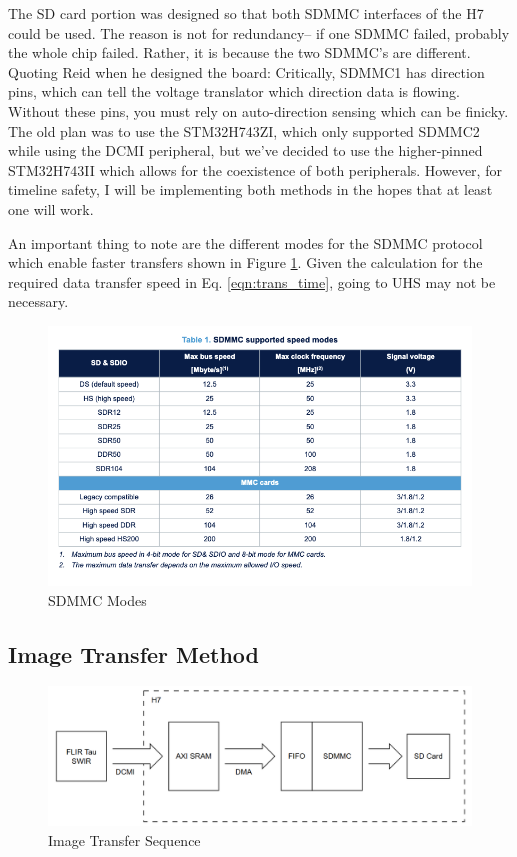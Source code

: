 \documentclass[12pt,a4paper]{article}
\begin{document}
    The SD card portion was designed so that both SDMMC interfaces of the H7 could 
    be used. The reason is not for redundancy-- if one SDMMC failed, probably the whole 
    chip failed. Rather, it is because the two SDMMC's are different. Quoting Reid when 
    he designed the board: Critically, SDMMC1 has direction pins, which can tell 
    the voltage translator which direction data is flowing. Without these pins, 
    you must rely on auto-direction sensing which can be finicky. The old plan
     was to use the STM32H743ZI, which only supported SDMMC2 while using the DCMI peripheral,
      but we’ve decided to use the higher-pinned STM32H743II which allows for the coexistence of both peripherals.
    However, for timeline safety, I will be implementing both methods in the hopes that at least one will work. 

    An important thing to note are the different modes for the SDMMC protocol 
    which enable faster transfers shown in Figure \ref{fig:SDMMC_bus_spe}. Given the 
    calculation for the required data transfer speed in Eq. \eqref{eqn:trans_time}, 
    going to UHS may not be necessary. 

    \begin{figure}[H]
        \centering
        \includegraphics[width=0.98\linewidth]{../figures/SDMMC_bus_speeds.png}
        \caption{SDMMC Modes}
        \label{fig:SDMMC_bus_spe}
    \end{figure}


    \subsection{Image Transfer Method}
    \begin{figure}[H]
        \centering
        \includegraphics[width=0.98\linewidth]{../figures/PAY_transfer_seq.png}
        \caption{Image Transfer Sequence}
        \label{fig:PAY_tra_seq}
    \end{figure}
\end{document}
